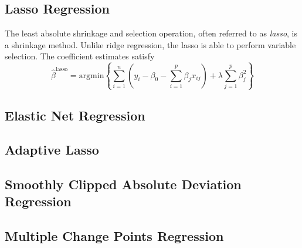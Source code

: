 \documentclass{article}
\newcommand{\argmin}{\text{argmin}}
\begin{document}
\subsection{Lasso Regression}

The least absolute shrinkage and selection operation, often referred to as \textit{lasso}, is a shrinkage method. Unlike ridge regression, the lasso is able to perform variable selection. The coefficient estimates satisfy
\[
	\hat{\beta}^{\text{lasso}}=\argmin\left\{ \sum\limits_{i = 1}^n \left( y_i - \beta_0 - \sum\limits_{i = 1}^p \beta_j x_{ij} \right) + \lambda\sum\limits_{j = 1}^p \beta_j^2 \right\}
\]

\subsection{Elastic Net Regression}

\subsection{Adaptive Lasso}

\subsection{Smoothly Clipped Absolute Deviation Regression}

\subsection{Multiple Change Points Regression}



\end{document}
